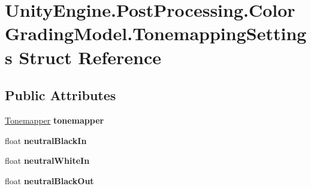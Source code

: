 \hypertarget{struct_unity_engine_1_1_post_processing_1_1_color_grading_model_1_1_tonemapping_settings}{}\section{Unity\+Engine.\+Post\+Processing.\+Color\+Grading\+Model.\+Tonemapping\+Settings Struct Reference}
\label{struct_unity_engine_1_1_post_processing_1_1_color_grading_model_1_1_tonemapping_settings}
\subsection*{Public Attributes}
\begin{DoxyCompactItemize}
\item 
\mbox{\label{struct_unity_engine_1_1_post_processing_1_1_color_grading_model_1_1_tonemapping_settings_a96a7b7dcb0a6d40679501271d965f550}} 
\mbox{\hyperlink{class_unity_engine_1_1_post_processing_1_1_color_grading_model_a4955bb9dfed7e27c93e7493ff66f3de6}{Tonemapper}} {\bfseries tonemapper}
\item 
\mbox{\label{struct_unity_engine_1_1_post_processing_1_1_color_grading_model_1_1_tonemapping_settings_a449e4735503e3a9074f1c7e59cf899ac}} 
float {\bfseries neutral\+Black\+In}
\item 
\mbox{\label{struct_unity_engine_1_1_post_processing_1_1_color_grading_model_1_1_tonemapping_settings_a8eeb01f595de7c751e7b99967aece296}} 
float {\bfseries neutral\+White\+In}
\item 
\mbox{\label{struct_unity_engine_1_1_post_processing_1_1_color_grading_model_1_1_tonemapping_settings_a81e19642855ceb6cfbd08e6726d1bc96}} 
float {\bfseries neutral\+Black\+Out}
\item 
\mbox{\label{struct_unity_engine_1_1_post_processing_1_1_color_grading_model_1_1_tonemapping_settings_a6e3b523ad9572827ac0e5aea8b96cb4c}} 

\end{DoxyCompactItemize}
